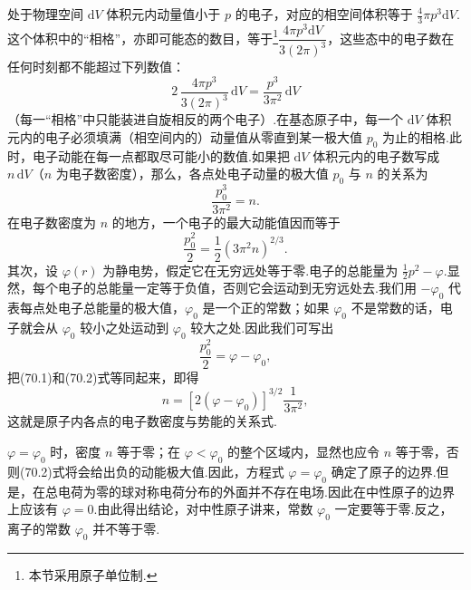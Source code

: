处于物理空间 $\mathrm{d}V$ 体积元内动量值小于 $p$ 的电子，对应的相空间体积等于 $\frac{4}{3}\pi p^{3}\mathrm{d}V$.这个体积中的“相格”，亦即可能态的数目，等于\footnote{本节采用原子单位制.}$\dfrac{4\pi p^{3}\mathrm{d}V}{3(2\pi)^{3}}$，这些态中的电子数在任何时刻都不能超过下列数值：
\begin{equation*}
  2\,\frac{4\pi p^{3}}{3(2\pi)^{3}}\,\mathrm{d}V=\frac{p^{3}}{3\pi^{2}}\,\mathrm{d}V
\end{equation*}
（每一“相格”中只能装进自旋相反的两个电子）.在基态原子中，每一个 $\mathrm{d}V$ 体积元内的电子必须填满（相空间内的）动量值从零直到某一极大值 $p_0$ 为止的相格.此时，电子动能在每一点都取尽可能小的数值.如果把 $\mathrm{d}V$ 体积元内的电子数写成 $n\,\mathrm{d}V$（$n$ 为电子数密度），那么，各点处电子动量的极大值 $p_0$ 与 $n$ 的关系为
\begin{equation*}
  \frac{p_0^{3}}{3\pi^{2}}=n.
\end{equation*}
在电子数密度为 $n$ 的地方，一个电子的最大动能值因而等于
\begin{equation}
  \frac{p_0^{2}}{2}=\frac{1}{2}\left(3\pi^{2}n\right)^{2/3}.
\end{equation}
其次，设 $\varphi(r)$ 为静电势，假定它在无穷远处等于零.电子的总能量为 $\frac{1}{2}p^{2}-\varphi$.显然，每个电子的总能量一定等于负值，否则它会运动到无穷远处去.我们用 $-\varphi_0$ 代表每点处电子总能量的极大值，$\varphi_0$ 是一个正的常数；如果 $\varphi_0$ 不是常数的话，电子就会从 $\varphi_0$ 较小之处运动到 $\varphi_0$ 较大之处.因此我们可写出
\begin{equation}
  \frac{p_0^{2}}{2}=\varphi-\varphi_0,
\end{equation}
把(70.1)和(70.2)式等同起来，即得
\begin{equation}
  n=\left[2(\varphi-\varphi_0)\right]^{3/2}\frac{1}{3\pi^{2}},
\end{equation}
这就是原子内各点的电子数密度与势能的关系式.

$\varphi=\varphi_0$ 时，密度 $n$ 等于零；在 $\varphi<\varphi_0$ 的整个区域内，显然也应令 $n$ 等于零，否则(70.2)式将会给出负的动能极大值.因此，方程式 $\varphi=\varphi_0$ 确定了原子的边界.但是，在总电荷为零的球对称电荷分布的外面并不存在电场.因此在中性原子的边界上应该有 $\varphi=0$.由此得出结论，对中性原子讲来，常数 $\varphi_0$ 一定要等于零.反之，离子的常数 $\varphi_0$ 并不等于零.

